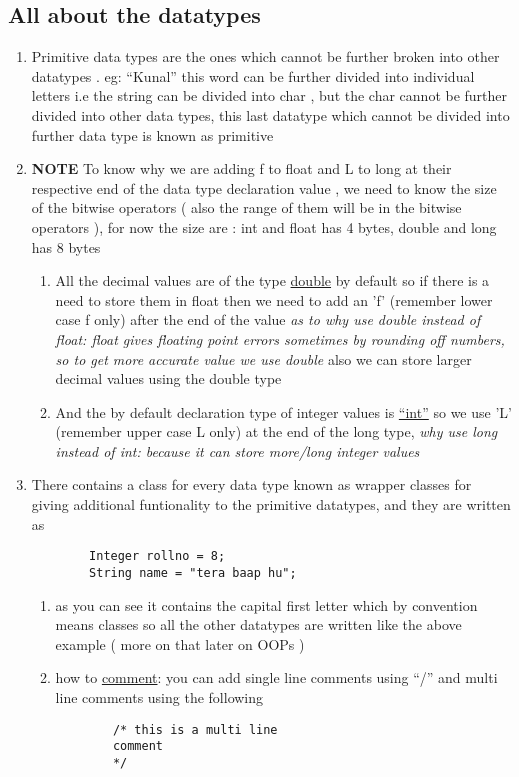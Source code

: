 \documentclass[11pt]{article}
\begin{document}
\subsection{All about the datatypes}
\label{sec:org4edc1a9}
\begin{enumerate}
\item Primitive data types are the ones which cannot be further broken into other datatypes . eg: ``Kunal'' this word can be further divided into individual letters i.e the string can be divided into char , but the char cannot be further divided into other data types, this last datatype which cannot be divided into further data type is known as primitive
\item \textbf{NOTE} To know why we are adding f to float and L to long at their respective end of the data type declaration value , we need to know the size of the bitwise operators ( also the range of them will be in the bitwise operators ),
for now the size are : int and float has 4 bytes, double and long has 8 bytes
\begin{enumerate}
\item All the decimal values are of the type \uline{double} by default so if there is a need to store them in float then we need to add an 'f' (remember lower case f only) after the end of the value
\emph{as to why use double instead of float: float gives floating point errors sometimes by rounding off numbers, so to get more accurate value we use double}
also we can  store larger decimal values using the double type
\item And the by default declaration type of integer values is \uline{``int''} so we use 'L' (remember upper case L only) at the end of the long type,
\emph{why use long instead of int: because it can store more/long integer values}
\end{enumerate}
\item There contains a class for every data type known as wrapper classes for giving additional funtionality to the primitive datatypes, and they are written as
\begin{verbatim}
        Integer rollno = 8;
        String name = "tera baap hu";
\end{verbatim}
\begin{enumerate}
\item as you can see it contains the capital first letter which by convention means classes so all the other datatypes are written like the above example ( more on that later on OOPs )

\item how to \uline{comment}:  you can add single line comments using ``/'' and multi line comments using the following
\begin{verbatim}
        /* this is a multi line
        comment
        */
\end{verbatim}
\end{enumerate}
\end{enumerate}
\end{document}
